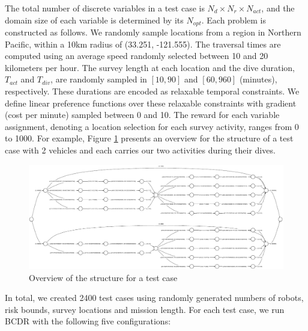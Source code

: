 \documentclass[jair,twoside,11pt,theapa]{article}
\begin{document}
The total number of discrete variables in a test case is $N_d\times N_r\times
N_{act}$, and the domain size of each variable is determined by its $N_{opt}$.
Each problem is constructed as follows. We randomly sample locations from a
region in Northern Pacific, within a 10km radius of (33.251, -121.555). The
traversal times are computed using an average speed randomly selected between 10
and 20 kilometers per hour. The survey length at each location and the dive
duration, $T_{act}$ and $T_{div}$, are randomly sampled in $[10,90]$ and
$[60,960]$ (minutes), respectively. These durations are encoded as relaxable
temporal constraints. We define linear preference functions over these relaxable
constraints with gradient (cost per minute) sampled between 0 and 10. The reward
for each variable assignment, denoting a location selection for each survey
activity, ranges from 0 to 1000. For example, Figure \ref{fig:test_case_auv}
presents an overview for the structure of a test case with 2 vehicles and each
carries our two activities during their dives.


\begin{figure}[htb]
	\centering
	\includegraphics[width=1.0\textwidth]{figures/test_case_auv.pdf}
	\caption{Overview of the structure for a test case}
	\label{fig:test_case_auv}
\end{figure}


In total, we created 2400 test cases using randomly generated numbers of robots,
risk bounds, survey locations and mission length. For each test case, we run
BCDR with the following five configurations:
\end{document}
